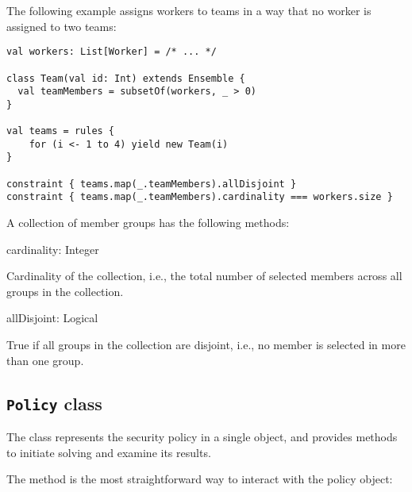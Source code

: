 The following example assigns workers to teams in a way that no worker is assigned to
two teams:

\begin{lstlisting}[style=ensembles]
val workers: List[Worker] = /* ... */

class Team(val id: Int) extends Ensemble {
  val teamMembers = subsetOf(workers, _ > 0)
}

val teams = rules {
    for (i <- 1 to 4) yield new Team(i)
}

constraint { teams.map(_.teamMembers).allDisjoint }
constraint { teams.map(_.teamMembers).cardinality === workers.size }
\end{lstlisting}

\noindent
A collection of member groups has the following methods:

\begin{dslsig}
cardinality: Integer
\end{dslsig}
\begin{dsldesc}
    Cardinality of the collection, i.e., the total number of selected members across all
    groups in the collection.
\end{dsldesc}

\begin{dslsig}
allDisjoint: Logical
\end{dslsig}
\begin{dsldesc}
    True if all groups in the collection are disjoint, i.e., no member is selected in
    more than one group.
\end{dsldesc}


\subsection{\texttt{Policy} class}

The  class represents the security policy in a single object, and provides
methods to initiate solving and examine its results.

The  method is the most straightforward way to interact with the policy
object:

